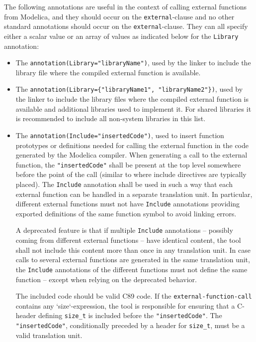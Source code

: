 The following annotations are useful in the context of calling external functions from Modelica, and they should occur on the {\lstinline!external!}-clause and no other standard annotations should occur on the {\lstinline!external!}-clause.
They can all specify either a scalar value or an array of values as indicated below for the {\lstinline!Library!} annotation:
\begin{itemize}
\item
  The {\lstinline!annotation(Library="libraryName")!}, used by the linker to include the library file where the compiled external function is available.
\item
  The {\lstinline!annotation(Library={"libraryName1", "libraryName2"})!}, used by the linker to include the library files where the compiled external function is available and additional libraries used to implement it.
  For shared libraries it is recommended to include all non-system libraries in this list.
\item
  The {\lstinline!annotation(Include="insertedCode")!}, used to insert function prototypes or definitions needed for calling the external function in the code generated by the Modelica compiler.
  When generating a call to the external function, the \lstinline!"insertedCode"! shall be present at the top level somewhere before the point of the call (similar to where include directives are typically placed).
  The \lstinline!Include! annotation shall be used in such a way that each external function can be handled in a separate translation unit.
  In particular, different external functions must not have \lstinline!Include! annotations providing exported definitions of the same function symbol to avoid linking errors.

  A deprecated feature is that if multiple \lstinline!Include! annotations -- possibly coming from different external functions -- have identical content, the tool shall not include this content more than once in any translation unit.
  In case calls to several external functions are generated in the same translation unit, the \lstinline!Include! annotations of the different functions must not define the same function -- except when relying on the deprecated behavior.

  The included code should be valid C89 code.
  If the \lstinline[language=grammar]!external-function-call! contains any `size`-expression, the tool is responsible for ensuring that a C-header defining \lstinline[language=C]!size_t! is included before the \lstinline!"insertedCode"!.
  The \lstinline!"insertedCode"!, conditionally preceded by a header for \lstinline[language=C]!size_t!, must be a valid translation unit.


\end{itemize}
